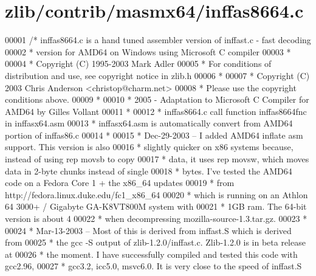 \hypertarget{zlib_2contrib_2masmx64_2inffas8664_8c_source}{}\section{zlib/contrib/masmx64/inffas8664.c}
\label{zlib_2contrib_2masmx64_2inffas8664_8c_source}

\begin{DoxyCode}
00001 \textcolor{comment}{/* inffas8664.c is a hand tuned assembler version of inffast.c - fast decoding}
00002 \textcolor{comment}{ * version for AMD64 on Windows using Microsoft C compiler}
00003 \textcolor{comment}{ *}
00004 \textcolor{comment}{ * Copyright (C) 1995-2003 Mark Adler}
00005 \textcolor{comment}{ * For conditions of distribution and use, see copyright notice in zlib.h}
00006 \textcolor{comment}{ *}
00007 \textcolor{comment}{ * Copyright (C) 2003 Chris Anderson <christop@charm.net>}
00008 \textcolor{comment}{ * Please use the copyright conditions above.}
00009 \textcolor{comment}{ *}
00010 \textcolor{comment}{ * 2005 - Adaptation to Microsoft C Compiler for AMD64 by Gilles Vollant}
00011 \textcolor{comment}{ *}
00012 \textcolor{comment}{ * inffas8664.c call function inffas8664fnc in inffasx64.asm}
00013 \textcolor{comment}{ *  inffasx64.asm is automatically convert from AMD64 portion of inffas86.c}
00014 \textcolor{comment}{ *}
00015 \textcolor{comment}{ * Dec-29-2003 -- I added AMD64 inflate asm support.  This version is also}
00016 \textcolor{comment}{ * slightly quicker on x86 systems because, instead of using rep movsb to copy}
00017 \textcolor{comment}{ * data, it uses rep movsw, which moves data in 2-byte chunks instead of single}
00018 \textcolor{comment}{ * bytes.  I've tested the AMD64 code on a Fedora Core 1 + the x86\_64 updates}
00019 \textcolor{comment}{ * from http://fedora.linux.duke.edu/fc1\_x86\_64}
00020 \textcolor{comment}{ * which is running on an Athlon 64 3000+ / Gigabyte GA-K8VT800M system with}
00021 \textcolor{comment}{ * 1GB ram.  The 64-bit version is about 4%
00022 \textcolor{comment}{ * when decompressing mozilla-source-1.3.tar.gz.}
00023 \textcolor{comment}{ *}
00024 \textcolor{comment}{ * Mar-13-2003 -- Most of this is derived from inffast.S which is derived from}
00025 \textcolor{comment}{ * the gcc -S output of zlib-1.2.0/inffast.c.  Zlib-1.2.0 is in beta release at}
00026 \textcolor{comment}{ * the moment.  I have successfully compiled and tested this code with gcc2.96,}
00027 \textcolor{comment}{ * gcc3.2, icc5.0, msvc6.0.  It is very close to the speed of inffast.S}
}
\end{DoxyCode}
